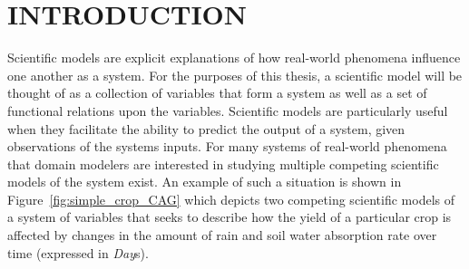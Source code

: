 \chapter{INTRODUCTION\label{chapter:introduction}}
Scientific models are explicit explanations of how real-world phenomena influence one another as a system.
For the purposes of this thesis, a scientific model will be thought of as a collection of variables that form a system as well as a set of functional relations upon the variables.
Scientific models are particularly useful when they facilitate the ability to predict the output of a system, given observations of the systems inputs.
For many systems of real-world phenomena that domain modelers are interested in studying multiple competing scientific models of the system exist.
An example of such a situation is shown in Figure~\ref{fig:simple_crop_CAG} which depicts two competing scientific models of a system of variables that seeks to describe how the yield of a particular crop is affected by changes in the amount of rain and soil water absorption rate over time (expressed in \emph{Day}s).

